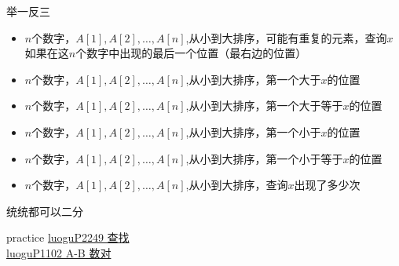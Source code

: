 \documentclass[aspectratio=169,xcolor=dvipsnames]{beamer}
\begin{document}
\begin{frame}[fragile]{举一反三}
    \begin{itemize}
        \item $n$个数字，$A[1],A[2],\ldots,A[n]$,从小到大排序，可能有重复的元素，查询$x$如果在这$n$个数字中出现的最后一个位置（最右边的位置）
        \item $n$个数字，$A[1],A[2],\ldots,A[n]$,从小到大排序，第一个大于$x$的位置
        \item $n$个数字，$A[1],A[2],\ldots,A[n]$,从小到大排序，第一个大于等于$x$的位置
        \item $n$个数字，$A[1],A[2],\ldots,A[n]$,从小到大排序，第一个小于$x$的位置
        \item $n$个数字，$A[1],A[2],\ldots,A[n]$,从小到大排序，第一个小于等于$x$的位置
        \item $n$个数字，$A[1],A[2],\ldots,A[n]$,从小到大排序，查询$x$出现了多少次
    \end{itemize}
    \vspace*{2.5em}
    统统都可以二分
\end{frame}


\begin{frame}{practice}
    \href{https://www.luogu.com.cn/problem/P2249}{luoguP2249 查找}\\
    \href{https://www.luogu.com.cn/problem/P1102}{luoguP1102 A-B 数对}
\end{frame}
\end{document}
